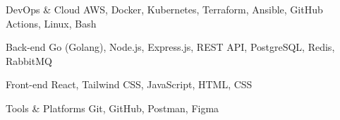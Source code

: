 
\begin{cvskills}

  \cvskill
    {DevOps \& Cloud} %
    {AWS, Docker, Kubernetes, Terraform, Ansible, GitHub Actions, Linux, Bash} %

  \cvskill
    {Back-end} %
    {Go (Golang), Node.js, Express.js, REST API, PostgreSQL, Redis, RabbitMQ} %

  \cvskill
    {Front-end} %
    {React, Tailwind CSS, JavaScript, HTML, CSS} %

  \cvskill
    {Tools \& Platforms} %
    {Git, GitHub, Postman, Figma} %

\end{cvskills}
